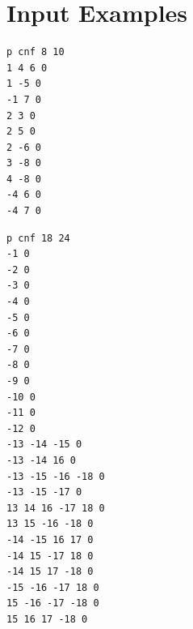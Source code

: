 \documentclass[a4paper, 12pt, bibliography=totoc]{scrartcl}
\begin{document}
\section{Input Examples}\label{app:input}

\lstset{numbers=none}

\begin{lstlisting}[caption={CNF clauses from example 4.1 on page 27 \cite{DiplomarbeitZisser}}, label={lst:clausesDA41}]
p cnf 8 10
1 4 6 0
1 -5 0
-1 7 0
2 3 0
2 5 0
2 -6 0
3 -8 0
4 -8 0
-4 6 0
-4 7 0
\end{lstlisting}
\begin{lstlisting}[caption={CNF clauses from random example with 12 units},label={lst:example18-24}]
p cnf 18 24
-1 0
-2 0
-3 0
-4 0
-5 0
-6 0
-7 0
-8 0
-9 0
-10 0
-11 0
-12 0
-13 -14 -15 0
-13 -14 16 0
-13 -15 -16 -18 0
-13 -15 -17 0
13 14 16 -17 18 0
13 15 -16 -18 0
-14 -15 16 17 0
-14 15 -17 18 0
-14 15 17 -18 0
-15 -16 -17 18 0
15 -16 -17 -18 0
15 16 17 -18 0
\end{lstlisting}




\newpage
\printbibliography
%
\end{document}
